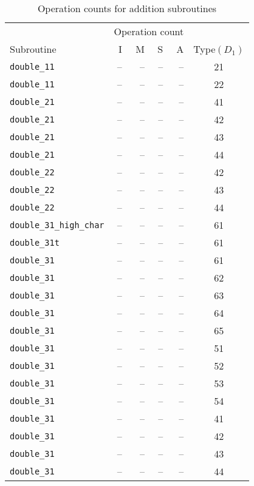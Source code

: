 \begin{longtable}{|l|rrrr|c|}
  \caption{Operation counts for addition subroutines\label{tab_doubling_costs}}\\
  \hline
  & \multicolumn{4}{c|}{Operation count} & \\
  Subroutine & I & M & S & A & Type$(D_1)$ \\
  \hline
  {\tt double\_11}  & -- & -- & -- & -- & 21 \\
  {\tt double\_11}  & -- & -- & -- & -- & 22 \\
  \hline  
  {\tt double\_21}  & -- & -- & -- & -- & 41 \\
  {\tt double\_21}  & -- & -- & -- & -- & 42 \\
  {\tt double\_21}  & -- & -- & -- & -- & 43 \\
  {\tt double\_21}  & -- & -- & -- & -- & 44 \\
  \hline
  {\tt double\_22}  & -- & -- & -- & -- & 42 \\
  {\tt double\_22}  & -- & -- & -- & -- & 43 \\
  {\tt double\_22}  & -- & -- & -- & -- & 44 \\
  \hline
  {\tt double\_31\_high\_char}  & -- & -- & -- & -- & 61 \\
  {\tt double\_31t}  & -- & -- & -- & -- & 61 \\
  {\tt double\_31}  & -- & -- & -- & -- & 61 \\
  {\tt double\_31}  & -- & -- & -- & -- & 62 \\
  {\tt double\_31}  & -- & -- & -- & -- & 63 \\
  {\tt double\_31}  & -- & -- & -- & -- & 64 \\
  {\tt double\_31}  & -- & -- & -- & -- & 65 \\
  {\tt double\_31}  & -- & -- & -- & -- & 51 \\
  {\tt double\_31}  & -- & -- & -- & -- & 52 \\
  {\tt double\_31}  & -- & -- & -- & -- & 53 \\
  {\tt double\_31}  & -- & -- & -- & -- & 54 \\
  {\tt double\_31}  & -- & -- & -- & -- & 41 \\
  {\tt double\_31}  & -- & -- & -- & -- & 42 \\
  {\tt double\_31}  & -- & -- & -- & -- & 43 \\
  {\tt double\_31}  & -- & -- & -- & -- & 44 \\
  \hline
\end{longtable}

